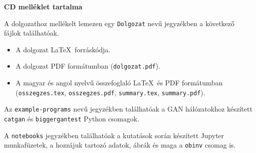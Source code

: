 \pagestyle{empty}

\noindent \textbf{\Large CD melléklet tartalma}

\vskip 1cm

\noindent A dolgozathoz mellékelt lemezen egy \texttt{Dolgozat} nevű jegyzékben a következő fájlok találhatóak.

\begin{itemize}
\item A dolgozat \LaTeX\ forráskódja.
\item A dolgozat PDF formátumban (\texttt{dolgozat.pdf}).
\item A magyar és angol nyelvű összefoglaló \LaTeX\ és PDF formátumban \\ (\texttt{osszegzes.tex}, \texttt{osszegzes.pdf}, \texttt{summary.tex}, \texttt{summary.pdf}).
\end{itemize}

Az \texttt{example-programs} nevű jegyzékben találhatóak a GAN hálózatokhoz készített \texttt{catgan} és \texttt{biggergantest} Python csomagok.

A \texttt{notebooks} jegyzékben találhatóak a kutatások során készített Jupyter munkafüzetek, a hozzájuk tartozó adatok, ábrák és maga a \texttt{obinv} csomag is.
